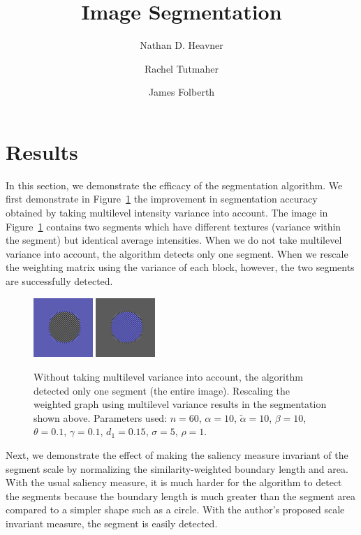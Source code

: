 \documentclass[12pt]{article}%
\date{}
\title{Image Segmentation}
\author{
 Nathan D. Heavner
      \and
  Rachel Tutmaher
  	\and
	James Folberth
}
\begin{document}
\maketitle

\section{Results}

In this section, we demonstrate the efficacy of the segmentation algorithm. We first demonstrate in Figure~\ref{fig:disk} the improvement in segmentation accuracy obtained by taking multilevel intensity variance into account. The image in Figure~\ref{fig:disk} contains two segments which have different textures (variance within the segment) but identical average intensities. When we do not take multilevel variance into account, the algorithm detects only one segment. When we rescale the weighting matrix using the variance of each block, however, the two segments are successfully detected.

\begin{figure}
\centering
\includegraphics[width=0.2\textwidth,height=0.2\textwidth]{checker_disk_good_seg_1.png} \hspace{.45cm}
\includegraphics[width=0.2\textwidth,height=0.2\textwidth]{checker_disk_good_seg_2.png}
\caption{Without taking multilevel variance into account, the algorithm detected only one segment (the entire image). Rescaling the weighted graph using multilevel variance results in the segmentation shown above. Parameters used: $n = 60$, $\alpha = 10$, $\tilde{\alpha} = 10$, $\beta = 10$, $\theta = 0.1$, $\gamma = 0.1$, $d_1 = 0.15$, $\sigma = 5$, $\rho = 1$.}
\label{fig:disk}
\end{figure}

Next, we demonstrate the effect of making the saliency measure invariant of the segment scale by normalizing the similarity-weighted boundary length and area. With the usual saliency measure, it is much harder for the algorithm to detect the segments because the boundary length is much greater than the segment area compared to a simpler shape such as a circle. With the author's proposed scale invariant measure, the segment is easily detected.
\end{document}
